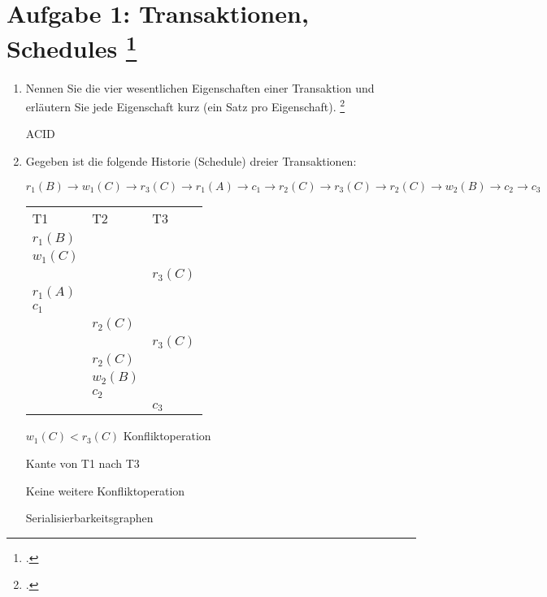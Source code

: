 \documentclass{lehramt-informatik-aufgabe}
\begin{document}
\section{Aufgabe 1: Transaktionen, Schedules
\footcite{db:pu:5}}

\begin{enumerate}

\item Nennen Sie die vier wesentlichen Eigenschaften einer
Transaktion und erläutern Sie jede Eigenschaft kurz (ein Satz pro
Eigenschaft).
\footcite[Thema 1 Teilaufgabe 1 Aufgabe 5]{examen:46116:2016:03}

\begin{antwort}
ACID
\end{antwort}

\item Gegeben ist die folgende Historie (Schedule) dreier Transaktionen:

$
r_1 (B) \rightarrow
w_1 (C) \rightarrow
r_3 (C) \rightarrow
r_1 (A) \rightarrow
c_1 \rightarrow
r_2 (C) \rightarrow
r_3 (C) \rightarrow
r_2 (C) \rightarrow
w_2 (B) \rightarrow
c_2 \rightarrow
c_3
$

\begin{antwort}
\begin{tabular}{lll}
T1 & T2 & T3 \\
$r_1 (B)$ &           &           \\
$w_1 (C)$ &           &           \\
          &           & $r_3 (C)$ \\
$r_1 (A)$ &           &           \\
$c_1$     &           &           \\
          & $r_2 (C)$ &           \\
          &           & $r_3 (C)$ \\
          & $r_2 (C)$ &           \\
          & $w_2 (B)$ &           \\
          & $c_2$     &           \\
          &           & $c_3$     \\
\end{tabular}

$w_1 (C) < r_3 (C)$ Konfliktoperation

Kante von T1 nach T3

Keine weitere Konfliktoperation

Serialisierbarkeitsgraphen


\end{antwort}
\end{enumerate}
\end{document}
